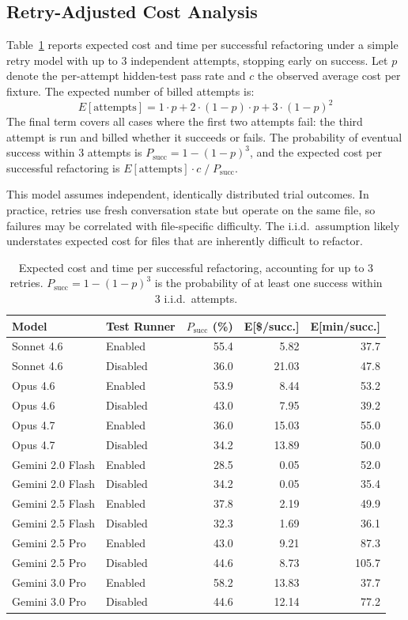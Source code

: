 \documentclass[11pt,letterpaper]{article}
\begin{document}
\subsection{Retry-Adjusted Cost Analysis}

Table~\ref{tab:cost} reports expected cost and time per successful refactoring under a simple retry model with up to 3 independent attempts, stopping early on success. Let $p$ denote the per-attempt hidden-test pass rate and $c$ the observed average cost per fixture. The expected number of billed attempts is:
\[
E[\text{attempts}] = 1 \cdot p + 2 \cdot (1{-}p) \cdot p + 3 \cdot (1{-}p)^2
\]
The final term covers all cases where the first two attempts fail: the third attempt is run and billed whether it succeeds or fails. The probability of eventual success within 3 attempts is $P_{\text{succ}} = 1 - (1{-}p)^3$, and the expected cost per successful refactoring is $E[\text{attempts}] \cdot c \;/\; P_{\text{succ}}$.

This model assumes independent, identically distributed trial outcomes. In practice, retries use fresh conversation state but operate on the same file, so failures may be correlated with file-specific difficulty. The i.i.d.\ assumption likely understates expected cost for files that are inherently difficult to refactor.

\begin{table}[ht]
\centering
\caption{Expected cost and time per successful refactoring, accounting for up to 3 retries. $P_{\text{succ}} = 1 - (1-p)^3$ is the probability of at least one success within 3 i.i.d.\ attempts.}
\label{tab:cost}
\small
\begin{tabular}{llrrr}
\toprule
\textbf{Model} & \textbf{Test Runner} & \textbf{$P_{\text{succ}}$ (\%)} & \textbf{E[\$/succ.]} & \textbf{E[min/succ.]} \\
\midrule
Sonnet 4.6     & Enabled  & 55.4 & 5.82 & 37.7 \\
Sonnet 4.6     & Disabled & 36.0 & 21.03 & 47.8 \\
Opus 4.6       & Enabled  & 53.9 & 8.44 & 53.2 \\
Opus 4.6       & Disabled & 43.0 & 7.95 & 39.2 \\
Opus 4.7       & Enabled  & 36.0 & 15.03 & 55.0 \\
Opus 4.7       & Disabled & 34.2 & 13.89 & 50.0 \\
\midrule
Gemini 2.0 Flash & Enabled  & 28.5 & 0.05 & 52.0 \\
Gemini 2.0 Flash & Disabled & 34.2 & 0.05 & 35.4 \\
Gemini 2.5 Flash & Enabled  & 37.8 & 2.19 & 49.9 \\
Gemini 2.5 Flash & Disabled & 32.3 & 1.69 & 36.1 \\
Gemini 2.5 Pro & Enabled  & 43.0 & 9.21 & 87.3 \\
Gemini 2.5 Pro & Disabled & 44.6 & 8.73 & 105.7 \\
Gemini 3.0 Pro & Enabled  & 58.2 & 13.83 & 37.7 \\
Gemini 3.0 Pro & Disabled & 44.6 & 12.14 & 77.2 \\
\bottomrule
\end{tabular}
\end{table}
\end{document}
